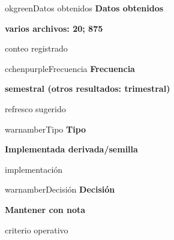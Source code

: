 \documentclass[9pt,a4paper]{extarticle}
\begin{document}
\vspace{0.04cm}
\begin{minipage}{0.24\textwidth}
\begin{metricbox}{okgreen}{Datos obtenidos}
{\large\bfseries Datos obtenidos}\par
{\Large\bfseries varios archivos: 20; 875}\par
{\normalsize conteo registrado}
\end{metricbox}
\end{minipage}\hfill
\begin{minipage}{0.24\textwidth}
\begin{metricbox}{cchenpurple}{Frecuencia}
{\large\bfseries Frecuencia}\par
{\large\bfseries semestral (otros resultados: trimestral)}\par
{\normalsize refresco sugerido}
\end{metricbox}
\end{minipage}\hfill
\begin{minipage}{0.24\textwidth}
\begin{metricbox}{warnamber}{Tipo}
{\large\bfseries Tipo}\par
{\normalsize\bfseries Implementada derivada/semilla}\par
{\normalsize implementación}
\end{metricbox}
\end{minipage}\hfill
\begin{minipage}{0.24\textwidth}
\begin{metricbox}{warnamber}{Decisión}
{\large\bfseries Decisión}\par
{\normalsize\bfseries Mantener con nota}\par
{\normalsize criterio operativo}
\end{metricbox}
\end{minipage}
\end{document}
